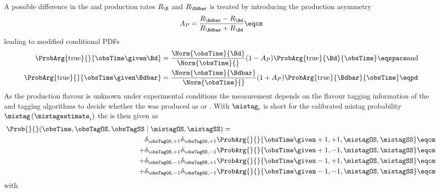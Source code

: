 %
A possible difference in the \Bd and \Bdbar production rates $R_{\B}$ and
$R_{\Bdbar}$ is treated by introducing the production asymmetry
%
\begin{equation}\label{eq:measurement_of_sin2beta:likelihood_fit:model:decay_time:production_asymmetry}
  A_P = \frac{R_{\Bdbar} - R_{\Bd}}{R_{\Bdbar} + R_{\Bd}}\eqcm
\end{equation}
%
leading to modified conditional \acp{PDF}
%
\begin{equation}\label{eq:measurement_of_sin2beta:likelihood_fit:model:decay_time:true_pdf}
  \begin{split}
    \ProbArg{\text{true}}{}{\obsTime\given\Bd}    &= \frac{\Norm{\obsTime}{\Bd}}{\Norm{\obsTime}{}}    (1 - A_P) \ProbArg{\text{true}}{\Bd}{\obsTime}     \eqspace \text{and} \\
    \ProbArg{\text{true}}{}{\obsTime\given\Bdbar} &= \frac{\Norm{\obsTime}{\Bdbar}}{\Norm{\obsTime}{}} (1 + A_P) \ProbArg{\text{true}}{\Bdbar}{\obsTime}  \eqpd
  \end{split}
\end{equation}
%
As the production flavour is unknown under experimental conditions the
measurement depends on the flavour tagging information of the \OS and \SSpi
tagging algorithms to decide whether the \Bmeson was produced as \Bd or \Bdbar.
With $\mistag_{i}$ is short for the calibrated mistag probability
$\mistag\left(\mistagestimate_{i}\right)$ the \PDF is then given as
%
\begin{equation}\label{eq:measurement_of_sin2beta:likelihood_fit:model:decay_time:measured_pdf_tagged_only}
\begin{split}
  \Prob{}{}(\obsTime, \obsTagOS, \obsTagSS &\mid \mistagOS, \mistagSS) = \\
        &\delta_{\obsTagOS,+1}\delta_{\obsTagSS,+1} \ProbArg{}{}{\obsTime \given +1, +1, \mistagOS, \mistagSS} \eqcm \\
      + &\delta_{\obsTagOS,+1}\delta_{\obsTagSS,-1} \ProbArg{}{}{\obsTime \given +1, -1, \mistagOS, \mistagSS} \eqcm \\
      + &\delta_{\obsTagOS,-1}\delta_{\obsTagSS,+1} \ProbArg{}{}{\obsTime \given -1, +1, \mistagOS, \mistagSS} \eqcm \\
      + &\delta_{\obsTagOS,-1}\delta_{\obsTagSS,-1} \ProbArg{}{}{\obsTime \given -1, -1, \mistagOS, \mistagSS} \eqcm 
  \end{split}
\end{equation}
%
with
%
